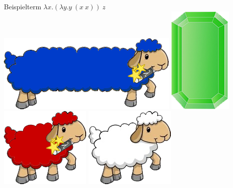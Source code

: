 \documentclass[18pt]{beamer}
\begin{document}
\begin{frame}{Beispielterm}
	$\lambda x. (\lambda y. y \ (x \ x)) \ z$ \\
	\vspace{0.3cm}
	\includegraphics[scale=1.7]{pictures/lamb_long_blue} \hspace{0.5cm} \includegraphics[scale=0.5]{pictures/gem_green} \\
	\vspace{0.3cm}
	\includegraphics[scale=1.7]{pictures/lamb_red} \hspace{0.1cm} \includegraphics[scale=1.7]{pictures/lamb_white}\\
	\vspace{0.3cm}

\end{frame}
\end{document}
